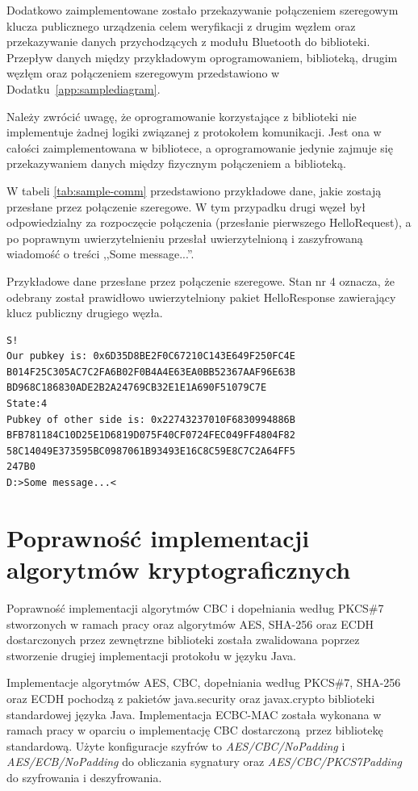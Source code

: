 Dodatkowo zaimplementowane zostało przekazywanie połączeniem szeregowym klucza publicznego urządzenia celem weryfikacji z drugim węzłem oraz przekazywanie danych przychodzących z modułu Bluetooth do biblioteki. Przepływ danych między przykładowym oprogramowaniem, biblioteką, drugim węzłęm oraz połączeniem szeregowym przedstawiono w Dodatku~\ref{app:samplediagram}.

Należy zwrócić uwagę, że oprogramowanie korzystające z biblioteki nie implementuje żadnej logiki związanej z protokołem komunikacji. Jest ona w całości zaimplementowana w bibliotece, a oprogramowanie jedynie zajmuje się przekazywaniem danych między fizycznym połączeniem a biblioteką.

W tabeli \ref{tab:sample-comm} przedstawiono przykładowe dane, jakie zostają przesłane przez połączenie szeregowe. W tym przypadku drugi węzeł był odpowiedzialny za rozpoczęcie połączenia (przesłanie pierwszego HelloRequest), a po poprawnym uwierzytelnieniu przesłał uwierzytelnioną i zaszyfrowaną wiadomość o treści ,,Some message...''.

\begin{table}
\centering
\caption{Przykładowe dane przesłane przez połączenie szeregowe. Stan nr 4 oznacza, że odebrany został prawidłowo uwierzytelniony pakiet HelloResponse zawierający klucz publiczny drugiego węzła.}
\begin{BVerbatim}
S!
Our pubkey is: 0x6D35D8BE2F0C67210C143E649F250FC4E
B014F25C305AC7C2FA6B02F0B4A4E63EA0BB52367AAF96E63B
BD968C186830ADE2B2A24769CB32E1E1A690F51079C7E
State:4
Pubkey of other side is: 0x22743237010F6830994886B
BFB781184C10D25E1D6819D075F40CF0724FEC049FF4804F82
58C14049E373595BC0987061B93493E16C8C59E8C7C2A64FF5
247B0
D:>Some message...<
\end{BVerbatim}
\label{tab:sample-comm}
\end{table}

\section{Poprawność implementacji algorytmów kryptograficznych}

Poprawność implementacji algorytmów CBC i dopełniania według PKCS\#7 stworzonych w ramach pracy oraz algorytmów AES, SHA-256 oraz ECDH dostarczonych przez zewnętrzne biblioteki została zwalidowana poprzez stworzenie drugiej implementacji protokołu w języku Java.

Implementacje algorytmów AES, CBC, dopełniania według PKCS\#7, SHA-256 oraz ECDH pochodzą z pakietów java.security oraz javax.crypto biblioteki standardowej języka Java. Implementacja ECBC-MAC została wykonana w ramach pracy w oparciu o implementację CBC dostarczoną przez bibliotekę standardową. Użyte konfiguracje szyfrów to \emph{AES/CBC/NoPadding} i \emph{AES/ECB/NoPadding} do obliczania sygnatury oraz \emph{AES/CBC/PKCS7Padding} do szyfrowania i deszyfrowania.

